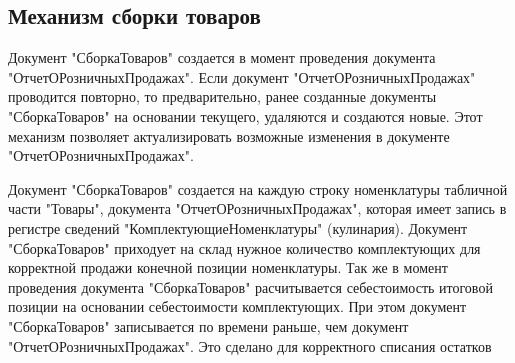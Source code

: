 \subsection{Механизм сборки товаров}\label{1004}	 

Документ "СборкаТоваров" создается в момент проведения документа "ОтчетОРозничныхПродажах".
Если документ "ОтчетОРозничныхПродажах" проводится повторно, то предварительно, ранее созданные документы "СборкаТоваров" на основании текущего, удаляются и создаются новые. Этот механизм позволяет актуализировать возможные изменения в документе "ОтчетОРозничныхПродажах".

Документ "СборкаТоваров" создается на каждую строку номенклатуры табличной части "Товары", документа  "ОтчетОРозничныхПродажах", которая имеет запись в регистре сведений "КомплектующиеНоменклатуры" (кулинария).
Документ "СборкаТоваров" приходует на склад нужное количество комплектующих для корректной продажи конечной позиции номенклатуры. Так же в момент проведения документа "СборкаТоваров" расчитывается себестоимость итоговой позиции на основании себестоимости комплектующих.
При этом документ "СборкаТоваров" записывается по времени раньше, чем документ "ОтчетОРозничныхПродажах". Это сделано для корректного списания остатков

